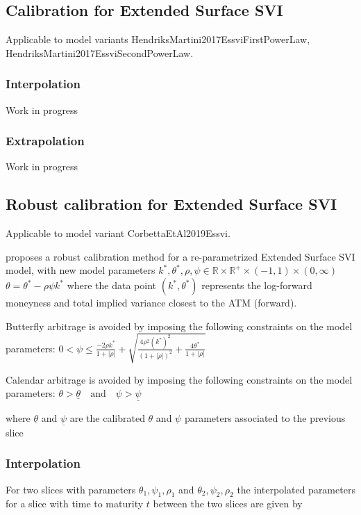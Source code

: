 \documentclass{amsart}
\theoremstyle{plain}
\numberwithin{equation}{section}
\begin{document}
\subsection{Calibration for Extended Surface SVI}

Applicable to model variants HendriksMartini2017EssviFirstPowerLaw, HendriksMartini2017EssviSecondPowerLaw.

\subsubsection{Interpolation}
Work in progress
\subsubsection{Extrapolation}
Work in progress

\subsection{Robust calibration for Extended Surface SVI}

Applicable to model variant CorbettaEtAl2019Essvi.

\cite{Corbetta_2019} proposes a robust calibration method for a re-parametrized Extended Surface SVI model, with new model parameters
$k^*, \theta^*, \rho, \psi \in \mathbb{R} \times \mathbb{R}^+ \times (-1, 1) \times (0, \infty)$
$\theta = \theta^* - \rho \psi k^*$
where the data point $(k^*, \theta^*)$ represents the log-forward moneyness and total implied variance closest to the ATM (forward).

Butterfly arbitrage is avoided by imposing the following constraints on the model parameters:
$0 < \psi \le \frac{-2\rho k^*}{1 + |\rho|} + \sqrt{\frac{4 \rho^2 (k^*)^2}{(1 + |\rho|)^2} + \frac{4 \theta^*}{1 + |\rho|}}$

Calendar arbitrage is avoided by imposing the following constraints on the model parameters:
$\theta > \underline{\theta} \quad \text{and} \quad \psi > \underline{\psi}$

where $\underline{\theta}$ and $\underline{\psi}$ are the calibrated $\theta$ and $\psi$ parameters associated to the previous slice

\subsubsection{Interpolation}

For two slices with parameters $\theta_1, \psi_1, \rho_1$ and $\theta_2, \psi_2, \rho_2$ the interpolated parameters for a slice with time to maturity $t$ between the two slices are given by
\end{document}
